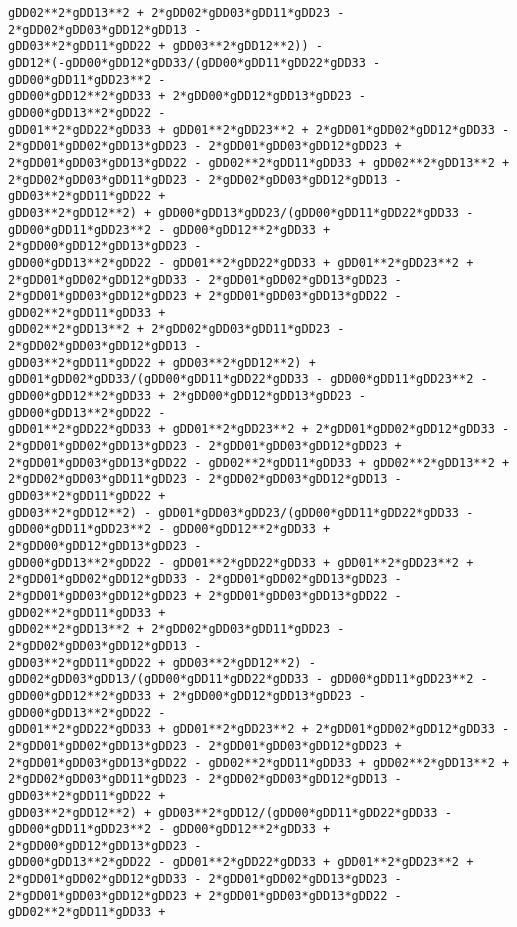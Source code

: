 \documentclass[landscape,letterpaper,10pt,english]{article}
\begin{document}
\begin{Verbatim}[commandchars=\\\{\}]
gDD02**2*gDD13**2 + 2*gDD02*gDD03*gDD11*gDD23 - 2*gDD02*gDD03*gDD12*gDD13 -
gDD03**2*gDD11*gDD22 + gDD03**2*gDD12**2)) -
gDD12*(-gDD00*gDD12*gDD33/(gDD00*gDD11*gDD22*gDD33 - gDD00*gDD11*gDD23**2 -
gDD00*gDD12**2*gDD33 + 2*gDD00*gDD12*gDD13*gDD23 - gDD00*gDD13**2*gDD22 -
gDD01**2*gDD22*gDD33 + gDD01**2*gDD23**2 + 2*gDD01*gDD02*gDD12*gDD33 -
2*gDD01*gDD02*gDD13*gDD23 - 2*gDD01*gDD03*gDD12*gDD23 +
2*gDD01*gDD03*gDD13*gDD22 - gDD02**2*gDD11*gDD33 + gDD02**2*gDD13**2 +
2*gDD02*gDD03*gDD11*gDD23 - 2*gDD02*gDD03*gDD12*gDD13 - gDD03**2*gDD11*gDD22 +
gDD03**2*gDD12**2) + gDD00*gDD13*gDD23/(gDD00*gDD11*gDD22*gDD33 -
gDD00*gDD11*gDD23**2 - gDD00*gDD12**2*gDD33 + 2*gDD00*gDD12*gDD13*gDD23 -
gDD00*gDD13**2*gDD22 - gDD01**2*gDD22*gDD33 + gDD01**2*gDD23**2 +
2*gDD01*gDD02*gDD12*gDD33 - 2*gDD01*gDD02*gDD13*gDD23 -
2*gDD01*gDD03*gDD12*gDD23 + 2*gDD01*gDD03*gDD13*gDD22 - gDD02**2*gDD11*gDD33 +
gDD02**2*gDD13**2 + 2*gDD02*gDD03*gDD11*gDD23 - 2*gDD02*gDD03*gDD12*gDD13 -
gDD03**2*gDD11*gDD22 + gDD03**2*gDD12**2) +
gDD01*gDD02*gDD33/(gDD00*gDD11*gDD22*gDD33 - gDD00*gDD11*gDD23**2 -
gDD00*gDD12**2*gDD33 + 2*gDD00*gDD12*gDD13*gDD23 - gDD00*gDD13**2*gDD22 -
gDD01**2*gDD22*gDD33 + gDD01**2*gDD23**2 + 2*gDD01*gDD02*gDD12*gDD33 -
2*gDD01*gDD02*gDD13*gDD23 - 2*gDD01*gDD03*gDD12*gDD23 +
2*gDD01*gDD03*gDD13*gDD22 - gDD02**2*gDD11*gDD33 + gDD02**2*gDD13**2 +
2*gDD02*gDD03*gDD11*gDD23 - 2*gDD02*gDD03*gDD12*gDD13 - gDD03**2*gDD11*gDD22 +
gDD03**2*gDD12**2) - gDD01*gDD03*gDD23/(gDD00*gDD11*gDD22*gDD33 -
gDD00*gDD11*gDD23**2 - gDD00*gDD12**2*gDD33 + 2*gDD00*gDD12*gDD13*gDD23 -
gDD00*gDD13**2*gDD22 - gDD01**2*gDD22*gDD33 + gDD01**2*gDD23**2 +
2*gDD01*gDD02*gDD12*gDD33 - 2*gDD01*gDD02*gDD13*gDD23 -
2*gDD01*gDD03*gDD12*gDD23 + 2*gDD01*gDD03*gDD13*gDD22 - gDD02**2*gDD11*gDD33 +
gDD02**2*gDD13**2 + 2*gDD02*gDD03*gDD11*gDD23 - 2*gDD02*gDD03*gDD12*gDD13 -
gDD03**2*gDD11*gDD22 + gDD03**2*gDD12**2) -
gDD02*gDD03*gDD13/(gDD00*gDD11*gDD22*gDD33 - gDD00*gDD11*gDD23**2 -
gDD00*gDD12**2*gDD33 + 2*gDD00*gDD12*gDD13*gDD23 - gDD00*gDD13**2*gDD22 -
gDD01**2*gDD22*gDD33 + gDD01**2*gDD23**2 + 2*gDD01*gDD02*gDD12*gDD33 -
2*gDD01*gDD02*gDD13*gDD23 - 2*gDD01*gDD03*gDD12*gDD23 +
2*gDD01*gDD03*gDD13*gDD22 - gDD02**2*gDD11*gDD33 + gDD02**2*gDD13**2 +
2*gDD02*gDD03*gDD11*gDD23 - 2*gDD02*gDD03*gDD12*gDD13 - gDD03**2*gDD11*gDD22 +
gDD03**2*gDD12**2) + gDD03**2*gDD12/(gDD00*gDD11*gDD22*gDD33 -
gDD00*gDD11*gDD23**2 - gDD00*gDD12**2*gDD33 + 2*gDD00*gDD12*gDD13*gDD23 -
gDD00*gDD13**2*gDD22 - gDD01**2*gDD22*gDD33 + gDD01**2*gDD23**2 +
2*gDD01*gDD02*gDD12*gDD33 - 2*gDD01*gDD02*gDD13*gDD23 -
2*gDD01*gDD03*gDD12*gDD23 + 2*gDD01*gDD03*gDD13*gDD22 - gDD02**2*gDD11*gDD33 +

\end{Verbatim}
\end{document}
